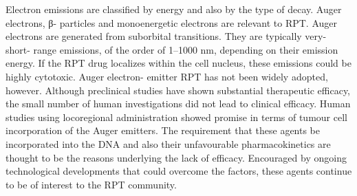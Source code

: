 \documentclass[
]{article}
\begin{document}
Electron emissions are classified by energy and also by the type of
decay. Auger electrons, β- particles and monoenergetic electrons are
relevant to RPT. Auger electrons are generated from suborbital
transitions. They are typically very- short- range emissions, of the
order of 1--1000 nm, depending on their emission energy. If the RPT drug
localizes within the cell nucleus, these emissions could be highly
cytotoxic. Auger electron- emitter RPT has not been widely adopted,
however. Although preclinical studies have shown substantial therapeutic
efficacy, the small number of human investigations did not lead to
clinical efficacy. Human studies using locoregional administration
showed promise in terms of tumour cell incorporation of the Auger
emitters. The requirement that these agents be incorporated into the DNA
and also their unfavourable pharmacokinetics are thought to be the
reasons underlying the lack of efficacy. Encouraged by ongoing
technological developments that could overcome the factors, these agents
continue to be of interest to the RPT community.
\end{document}
